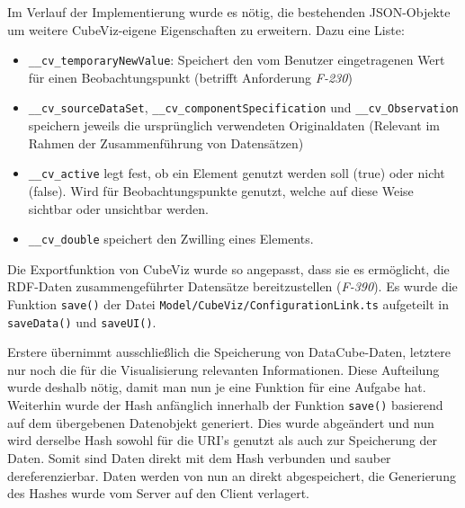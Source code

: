 \documentclass[11pt]{article}
\newcommand{\com}[1]{\marginpar{\em {\small{#1}}}} %
\begin{document}
Im Verlauf der Implementierung wurde es nötig, die bestehenden JSON-Objekte um weitere CubeViz-eigene Eigenschaften zu erweitern. Dazu eine Liste: 

\begin{itemize}
    \item \verb|__cv_temporaryNewValue|: Speichert den vom Benutzer eingetragenen Wert für einen Beobachtungspunkt (betrifft Anforderung \textit{F-230})
    
    \item \verb|__cv_sourceDataSet|, \verb|__cv_componentSpecification| und \verb|__cv_Observation| speichern jeweils die ursprünglich verwendeten Originaldaten (Relevant im Rahmen der Zusammenführung von Datensätzen)
    
    \item \verb|__cv_active| legt fest, ob ein Element genutzt werden soll (true) oder nicht (false). Wird für Beobachtungspunkte genutzt, welche auf diese Weise sichtbar oder unsichtbar werden.
    
    \item \verb|__cv_double| speichert den Zwilling eines Elements.
\end{itemize}

Die Exportfunktion von CubeViz wurde so angepasst,\com{Anforderung \\ F-390, S. \pageref{req:F390} \\ \\ Commit \\ 58f2e7} dass sie es ermöglicht, die RDF-Daten zusammengeführter Datensätze bereitzustellen (\emph{F-390}). Es wurde die Funktion \verb|save()| der Datei \verb|Model/CubeViz/ConfigurationLink.ts| aufgeteilt in \verb|saveData()| und \verb|saveUI()|. 

\newpage
\noindent
Erstere übernimmt ausschließlich die Speicherung von DataCube-Daten, letztere nur noch die für die Visualisierung relevanten Informationen. Diese Aufteilung wurde deshalb nötig, damit man nun je eine Funktion für eine Aufgabe hat. Weiterhin wurde der Hash anfänglich innerhalb der Funktion \verb|save()| basierend auf dem übergebenen Datenobjekt generiert. Dies wurde abgeändert und nun wird derselbe Hash sowohl für die URI's genutzt als auch zur Speicherung der Daten. Somit sind Daten direkt mit dem Hash verbunden und sauber dereferenzierbar. Daten werden von nun an direkt abgespeichert, die Generierung des Hashes wurde vom Server auf den Client verlagert.

%
%
%
\newpage
\end{document}
